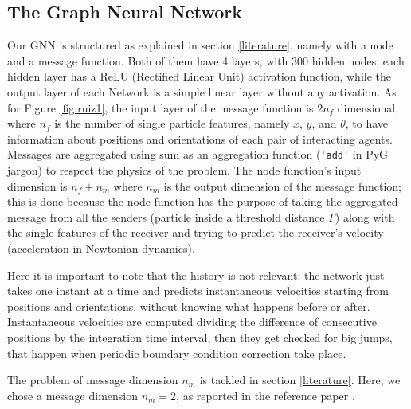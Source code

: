 \documentclass[../../master_thesis_np.tex]{subfiles}
\begin{document}
\subsection{The Graph Neural Network}
Our GNN is structured as explained in section \ref{literature}, namely with a node and a message function. 
Both of them have 4 layers, with 300 hidden nodes; each hidden layer has a ReLU (Rectified Linear Unit) activation function, while the output layer of each Network is a simple linear layer without any activation.
As for Figure \ref{fig:ruiz1}, the input layer of the message function is $2n_f$ dimensional, where $n_f$ is the number of single particle features, namely $x$, $y$, and $\theta$, to have information about positions and orientations of each pair of interacting agents.
Messages are aggregated using sum as an aggregation function (\verb|'add'| in PyG jargon) to respect the physics of the problem.
The node function's input dimension is $n_f + n_m$ where $n_m$ is the output dimension of the message function; this is done because the node function has the purpose of taking the aggregated message from all the senders (particle inside a threshold distance $\Gamma$) along with the single features of the receiver and trying to predict the receiver's velocity (acceleration in Newtonian dynamics).

Here it is important to note that the history is not relevant: the network just takes one instant at a time and predicts instantaneous velocities starting from positions and orientations, without knowing what happens before or after.
Instantaneous velocities are computed dividing the difference of consecutive positions by the integration time interval, then they get checked for big jumps, that happen when periodic boundary condition correction take place.

The problem of message dimension $n_m$ is tackled in section \ref{literature}. 
Here, we chose a message dimension $n_m = 2$, as reported in the reference paper \cite{ruiz-garcia_discovering_2024}.
\end{document}
